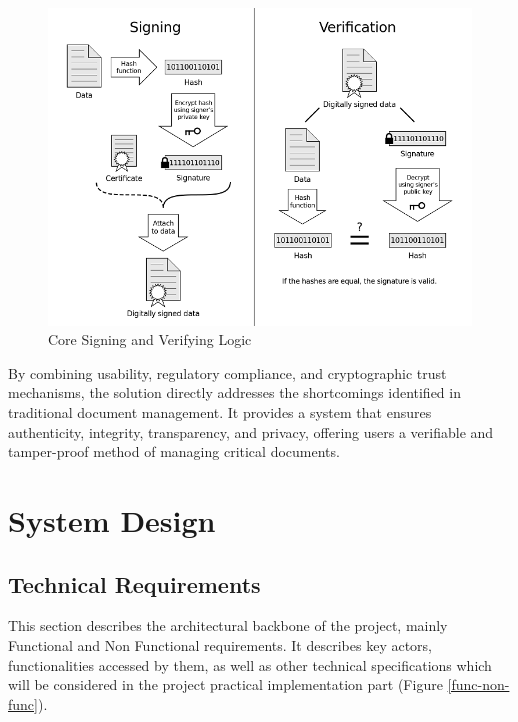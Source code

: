 \begin{figure}[H]
    \centering
    \includegraphics[width=18cm]{"images/signing-verifying.png"}
    \caption{Core Signing and Verifying Logic}
    \label{signing-verifying}
\end{figure}

By combining usability, regulatory compliance, and cryptographic trust mechanisms, the solution directly addresses the shortcomings identified in traditional document management. It provides a system that ensures authenticity, integrity, transparency, and privacy, offering users a verifiable and tamper-proof method of managing critical documents.


\chapter{System Design}
\section{Technical Requirements}
This section describes the architectural backbone of the project, mainly Functional and Non Functional requirements. It describes key actors, functionalities accessed by them, as well as other technical specifications which will be considered in the project practical implementation part (Figure \ref{func-non-func}). 

